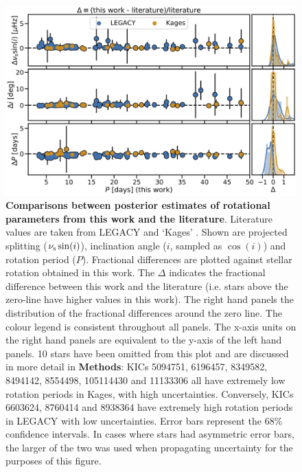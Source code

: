 \documentclass[12pt]{article}
\begin{document}
\begin{figure}[h!]
	\centering
	\includegraphics[width=\textwidth]{Images/litcomp_alt2.jpg}
	\caption{\textbf{Comparisons between posterior estimates of rotational parameters from this work and the literature}. Literature values are taken from LEGACY and `Kages' \cite[private communication]{m_davies+2016, m_lund+2017}. Shown are projected splitting ($\nu_{\rm s}\sin(i)$), inclination angle ($i$, sampled as $\cos(i)$) and rotation period ($P$). Fractional differences are plotted against stellar rotation obtained in this work. The $\Delta$ indicates the fractional difference between this work and the literature (i.e. stars above the zero-line have higher values in this work). The right hand panels the distribution of the fractional differences around the zero line. The colour legend is consistent throughout all panels. The x-axis units on the right hand panels are equivalent to the y-axis of the left hand panels. 10 stars have been omitted from this plot and are discussed in more detail in \textbf{Methods}: KICs 5094751, 6196457, 8349582, 8494142, 8554498, 105114430 and 11133306 all have extremely low rotation periods in Kages, with high uncertainties. Conversely, KICs 6603624, 8760414 and 8938364 have extremely high rotation periods in LEGACY with low uncertainties. Error bars represent the 68\% confidence intervals. In cases where stars had asymmetric error bars, the larger of the two was used when propagating uncertainty for the purposes of this figure.}
	\label{fig:legacykages}
\end{figure}
\end{document}
